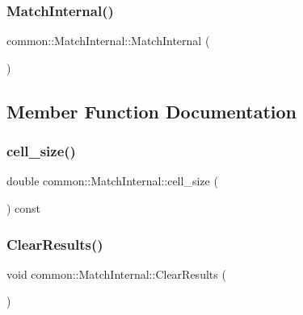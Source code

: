 \subsubsection{\texorpdfstring{Match\+Internal()}{MatchInternal()}}
{\footnotesize\ttfamily common\+::\+Match\+Internal\+::\+Match\+Internal (\begin{DoxyParamCaption}{ }\end{DoxyParamCaption})\hspace{0.3cm}{\ttfamily [inline]}}



\subsection{Member Function Documentation}
\mbox{\label{classcommon_1_1MatchInternal_a69a417791950569fed61f59ba3cf79a9}} 
\subsubsection{\texorpdfstring{cell\+\_\+size()}{cell\_size()}}
{\footnotesize\ttfamily double common\+::\+Match\+Internal\+::cell\+\_\+size (\begin{DoxyParamCaption}{ }\end{DoxyParamCaption}) const\hspace{0.3cm}{\ttfamily [inline]}}

\mbox{\label{classcommon_1_1MatchInternal_a519c8d85ca7a2d31353a3a3ce2e68c34}} 
\subsubsection{\texorpdfstring{Clear\+Results()}{ClearResults()}}
{\footnotesize\ttfamily void common\+::\+Match\+Internal\+::\+Clear\+Results (\begin{DoxyParamCaption}{ }\end{DoxyParamCaption})\hspace{0.3cm}{\ttfamily [inline]}}



